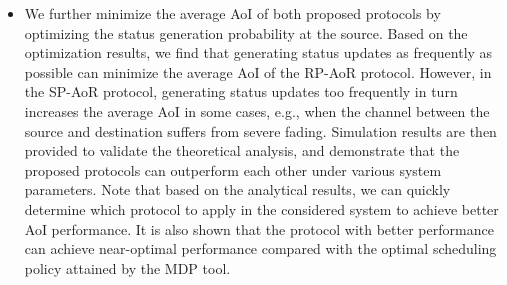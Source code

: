 \documentclass{IEEEtran}
\begin{document}
\begin{itemize}
		
		\item We further minimize the average AoI of both proposed protocols by optimizing the status generation probability at the source. Based on the optimization results, we find that generating status updates as frequently as possible can minimize the average AoI of the RP-AoR protocol. However, in the SP-AoR protocol, generating status updates too frequently in turn increases the average AoI in some cases, e.g., when the channel between the source and destination suffers from severe fading. Simulation results are then provided to validate the theoretical analysis, and demonstrate that the proposed protocols can outperform each other under various  system parameters. Note that based on the analytical results, we can quickly determine which protocol to apply in the considered system to achieve better AoI performance. It is also shown that the protocol with better performance can achieve near-optimal performance compared with the optimal scheduling policy attained by the MDP tool.
		

			
		

\end{itemize}
 
\end{document}
